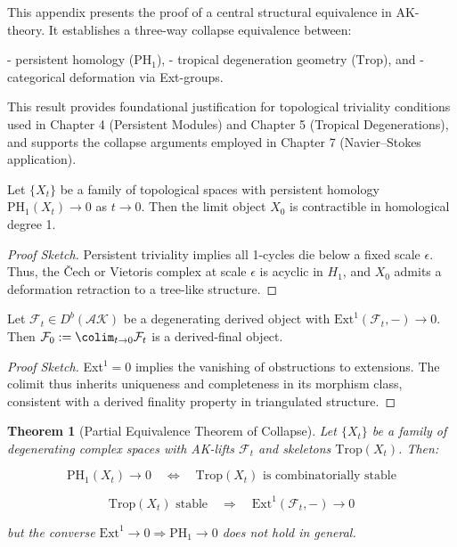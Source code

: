 \documentclass[11pt]{article}
\newtheorem{theorem}{Theorem}[section]
\begin{document}
This appendix presents the proof of a central structural equivalence in AK-theory.  
It establishes a three-way collapse equivalence between:

- persistent homology ($\mathrm{PH}_1$),
- tropical degeneration geometry ($\mathrm{Trop}$), and
- categorical deformation via Ext-groups.

This result provides foundational justification for topological triviality conditions  
used in Chapter 4 (Persistent Modules) and Chapter 5 (Tropical Degenerations),  
and supports the collapse arguments employed in Chapter 7 (Navier–Stokes application).

\begin{lemma}
Let $\{X_t\}$ be a family of topological spaces with persistent homology $\mathrm{PH}_1(X_t) \to 0$ as $t \to 0$.  
Then the limit object $X_0$ is contractible in homological degree 1.
\end{lemma}

\begin{proof}[Proof Sketch]
Persistent triviality implies all 1-cycles die below a fixed scale $\epsilon$.  
Thus, the \v{C}ech or Vietoris complex at scale $\epsilon$ is acyclic in $H_1$, and $X_0$ admits a deformation retraction to a tree-like structure.
\end{proof}

\begin{lemma}
Let $\mathcal{F}_t \in D^b(\mathcal{AK})$ be a degenerating derived object with $\mathrm{Ext}^1(\mathcal{F}_t, -) \to 0$.  
Then $\mathcal{F}_0 := \colim_{t \to 0} \mathcal{F}_t$ is a derived-final object.
\end{lemma}

\begin{proof}[Proof Sketch]
Ext$^1 = 0$ implies the vanishing of obstructions to extensions.  
The colimit thus inherits uniqueness and completeness in its morphism class, consistent with a derived finality property in triangulated structure.
\end{proof}

\begin{theorem}[Partial Equivalence Theorem of Collapse]
Let $\{X_t\}$ be a family of degenerating complex spaces with AK-lifts $\mathcal{F}_t$ and skeletons $\mathrm{Trop}(X_t)$. Then:

\[
\mathrm{PH}_1(X_t) \to 0 \quad \Leftrightarrow \quad \mathrm{Trop}(X_t) \text{ is combinatorially stable}
\]

\[
\mathrm{Trop}(X_t) \text{ stable} \quad \Rightarrow \quad \mathrm{Ext}^1(\mathcal{F}_t, -) \to 0
\]

but the converse $\mathrm{Ext}^1 \to 0 \Rightarrow \mathrm{PH}_1 \to 0$ does not hold in general.

\end{theorem}
\end{document}

